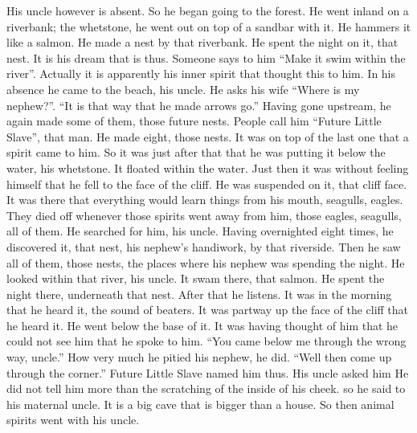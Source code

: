 \begin{pairs}
\begin{Rightside}
His uncle however is absent.
\pend
\pstart
{}So he began going to the forest.
He went inland on a riverbank;
the whetstone, he went out on top of a sandbar with it.
He hammers it like a salmon.
He made a nest by that riverbank.
He spent the night on it, that nest.
It is his dream that is thus.
Someone says to him “Make it swim within the river”.
Actually it is apparently his inner spirit that thought this to him.
\pend
\pstart
{}In his absence he came to the beach, his uncle.
He asks his wife “Where is my nephew?”.
\qqk{}“It is that way that he made arrows go.”
\pend
\pstart
{}Having gone upstream, he again made some of them, those future nests.
People call him “Future Little Slave”, that man.
He made eight, those nests.
It was on top of the last one that a spirit came to him.
So it was just after that that he was putting it below the water, his whetstone.
It floated within the water.
Just then it was without feeling himself that he fell to the face of the cliff.
He was suspended on it, that cliff face.
It was there that everything would learn things from his mouth, seagulls, eagles.
They died off whenever those spirits went away from him, those eagles, seagulls, all of them.
\pend
\pstart
{}He searched for him, his uncle.
Having overnighted eight times, he discovered it, that nest, his nephew’s handiwork, by that riverside.
Then he saw all of them, those nests, the places where his nephew was spending the night.
He looked within that river, his uncle.
It swam there, that salmon.
He spent the night there, underneath that nest.
After that he listens.
It was in the morning that he heard it, the sound of beaters.
It was partway up the face of the cliff that he heard it.
He went below the base of it.
It was having thought of him that he could not see him that he spoke to him.
\qqk{}“You came below me through the wrong way, uncle.”
How very much he pitied his nephew, he did.
\qqk{}“Well then come up through the corner.”
Future Little Slave named him thus.
His uncle asked him
He did not tell him more than the scratching of the inside of his cheek.
so he said to his maternal uncle.
It is a big cave that is bigger than a house.
\pend
\pstart
{}So then animal spirits went with his uncle.

\end{Rightside}
\end{pairs}
